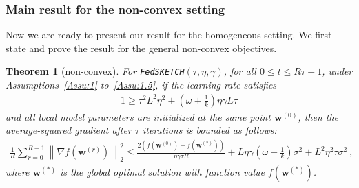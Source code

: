 \documentclass[sigconf, anonymous, review]{acmart}
\newtheorem{theorem}{Theorem}
\begin{document}
\subsubsection{Main result for the non-convex setting}
Now we are ready to present our result for the homogeneous setting. We first state and prove the result for the general non-convex objectives.  
\begin{theorem}[non-convex]\label{thm:lsgwd-lr} For \texttt{FedSKETCH}$(\tau, \eta, \gamma)$, for all $0\leq t\leq R\tau-1$,  under Assumptions~\ref{Assu:1} to~\ref{Assu:1.5}, if the learning rate satisfies \begin{align}
   1\geq {\tau^2 L^2\eta^2}+\left(\omega+\frac{1}{k}\right){\eta\gamma L}{\tau}
\label{eq:cnd-thm4.3}
\end{align}
and all local model parameters are initialized at the same point ${\boldsymbol{w}}^{(0)}$, then the average-squared gradient after $\tau$ iterations is bounded as follows:
\begin{align}
        \frac{1}{R}\sum_{r=0}^{R-1}\left\|\nabla f({\boldsymbol{w}}^{(r)})\right\|_2^2\leq \frac{2\left(f(\boldsymbol{w}^{(0)})-f(\boldsymbol{w}^{(*)})\right)}{\eta\gamma\tau R}+{L\eta\gamma{\left(\omega+\frac{1}{k}\right)}}\sigma^2+{L^2\eta^2\tau }\sigma^2 \ , \label{eq:thm1-result} 
\end{align}
where $\boldsymbol{w}^{(*)}$ is the global optimal solution with  function value $f(\boldsymbol{w}^{(*)})$.
\end{theorem}
\end{document}
